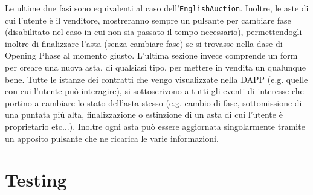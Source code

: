 Le ultime due fasi sono equivalenti al caso dell'\texttt{EnglishAuction}. Inoltre, le aste di cui l'utente è il venditore, mostreranno sempre un pulsante per cambiare fase (disabilitato nel caso in cui non sia passato il tempo necessario), permettendogli inoltre di finalizzare l'asta (senza cambiare fase) se si trovasse nella dase di Opening Phase al momento giusto. L'ultima sezione invece comprende un form per creare una nuova asta, di qualsiasi tipo, per mettere in vendita un qualunque bene.\newline
Tutte le istanze dei contratti che vengo visualizzate nella DAPP (e.g. quelle con cui l'utente può interagire), si sottoscrivono a tutti gli eventi di interesse che portino a cambiare lo stato dell'asta stesso (e.g. cambio di fase, sottomissione di una puntata più alta, finalizzazione o estinzione di un asta di cui l'utente è proprietario etc...). Inoltre ogni asta può essere aggiornata singolarmente tramite un apposito pulsante che ne ricarica le varie informazioni.
\section{Testing}
